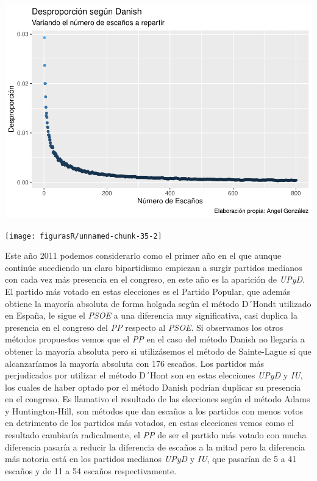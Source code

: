 \documentclass[12pt,a4paper,]{book}
\numberwithin{dummy}{section}
\theoremstyle{ocrenumbox}
\theoremstyle{blacknumex}
\theoremstyle{blacknumbox}
\theoremstyle{ocrenum}
\theoremstyle{ocrenum}
\begin{document}
\begin{center}\includegraphics[width=1\linewidth]{figurasR/unnamed-chunk-35-1} \end{center}

\begin{center}\texttt{[image: figurasR/unnamed-chunk-35-2]} \end{center}

Este año 2011 podemos considerarlo como el primer año en el que aunque
continúe sucediendo un claro bipartidismo empiezan a surgir partidos
medianos con cada vez más presencia en el congreso, en este año es la
aparición de \emph{UPyD}. El partido más votado en estas elecciones es
el Partido Popular, que además obtiene la mayoría absoluta de forma
holgada según el método D´Hondt utilizado en España, le sigue el
\emph{PSOE} a una diferencia muy significativa, casi duplica la
presencia en el congreso del \emph{PP} respecto al \emph{PSOE}. Si
observamos los otros métodos propuestos vemos que el \emph{PP} en el
caso del método Danish no llegaría a obtener la mayoría absoluta pero si
utilizásemos el método de Sainte-Lague sí que alcanzaríamos la mayoría
absoluta con 176 escaños. Los partidos más perjudicados por utilizar el
método D´Hont son en estas elecciones \emph{UPyD} y \emph{IU}, los
cuales de haber optado por el método Danish podrían duplicar su
presencia en el congreso. Es llamativo el resultado de las elecciones
según el método Adams y Huntington-Hill, son métodos que dan escaños a
los partidos con menos votos en detrimento de los partidos más votados,
en estas elecciones vemos como el resultado cambiaría radicalmente, el
\emph{PP} de ser el partido más votado con mucha diferencia pasaría a
reducir la diferencia de escaños a la mitad pero la diferencia más
notoria está en los partidos medianos \emph{UPyD} y \emph{IU}, que
pasarían de 5 a 41 escaños y de 11 a 54 escaños respectivamente.
\end{document}
